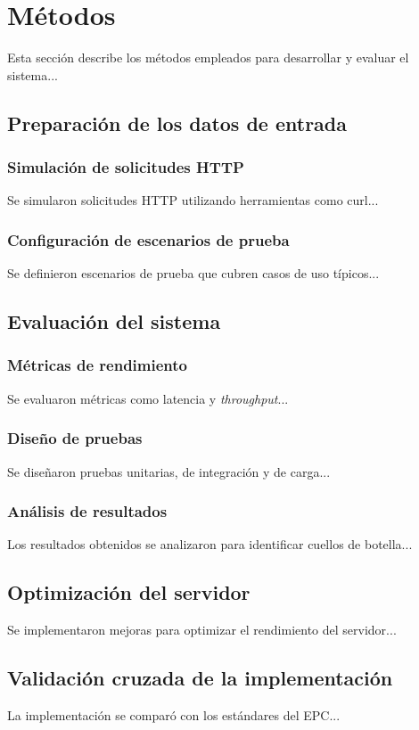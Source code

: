 \section{Métodos}
\label{sec:Metodos}
Esta sección describe los métodos empleados para desarrollar y evaluar el sistema...

\subsection{Preparación de los datos de entrada}
\label{subsec:PreparacionDatos}
\subsubsection{Simulación de solicitudes HTTP}
\label{subsubsec:SimulacionSolicitudes}
Se simularon solicitudes HTTP utilizando herramientas como curl...

\subsubsection{Configuración de escenarios de prueba}
\label{subsubsec:EscenariosPrueba}
Se definieron escenarios de prueba que cubren casos de uso típicos...

\subsection{Evaluación del sistema}
\label{subsec:EvaluacionSistema}
\subsubsection{Métricas de rendimiento}
\label{subsubsec:MetricasRendimiento}
Se evaluaron métricas como latencia y \textit{throughput}...

\subsubsection{Diseño de pruebas}
\label{subsubsec:DisenoPruebas}
Se diseñaron pruebas unitarias, de integración y de carga...

\subsubsection{Análisis de resultados}
\label{subsubsec:AnalisisResultados}
Los resultados obtenidos se analizaron para identificar cuellos de botella...

\subsection{Optimización del servidor}
\label{subsec:Optimizacion}
Se implementaron mejoras para optimizar el rendimiento del servidor...

\subsection{Validación cruzada de la implementación}
\label{subsec:ValidacionCruzada}
La implementación se comparó con los estándares del EPC...
